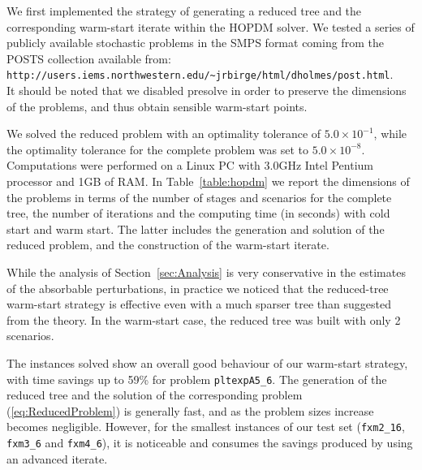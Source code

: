We first implemented the strategy of generating a reduced tree and 
the corresponding warm-start iterate within the HOPDM \cite{Gondzio96} 
solver. We tested a series of publicly available stochastic problems in 
the SMPS format \cite{SMPS} coming from the POSTS collection 
available from:\\
{\tt http://users.iems.northwestern.edu/\~{}jrbirge/html/dholmes/post.html}. \\
%
%
It should be noted that we disabled presolve %
in order to preserve the dimensions of the problems, and thus obtain 
sensible warm-start points.

We solved the reduced problem with an optimality tolerance of 
$5.0\times 10^{-1}$, while the optimality tolerance for the complete 
problem was set to $5.0\times 10^{-8}$. 
Computations were performed on a Linux PC with 3.0GHz Intel Pentium 
processor and 1GB of RAM.
In Table~\ref{table:hopdm} we report the dimensions of the problems 
in terms of the number of stages and scenarios for the complete 
tree, the number of iterations and the computing time (in seconds) 
with cold start and warm start. The latter includes the generation 
and solution of the reduced problem, and the construction of the 
warm-start iterate.

While the analysis of Section~\ref{sec:Analysis} is very conservative
in the estimates of the absorbable perturbations, in practice we noticed
that the reduced-tree warm-start strategy is effective even with
a much sparser tree than suggested from the theory.
In the warm-start case, the reduced tree was built with only 2 scenarios.

The instances solved show an overall good behaviour of our warm-start
strategy, with time savings up to 59\% for problem {\tt pltexpA5\_6}.
The generation of the reduced tree and the solution of the corresponding
problem (\ref{eq:ReducedProblem}) is generally fast, and as the problem 
sizes increase becomes negligible. However, for the smallest instances
of our test set ({\tt fxm2\_16}, {\tt fxm3\_6} and {\tt fxm4\_6}), it
is noticeable and consumes the savings produced by using an advanced
iterate.

